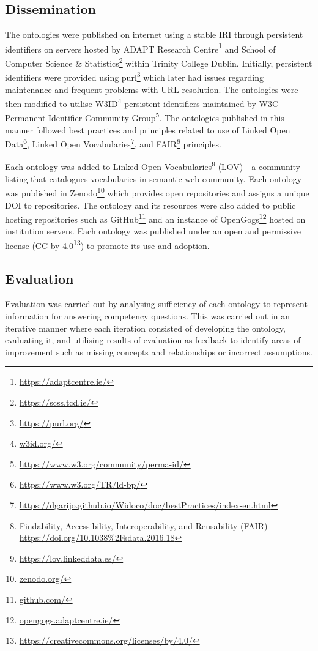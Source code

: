 \subsection{Dissemination}
The ontologies were published on internet using a stable IRI through persistent identifiers on servers hosted by ADAPT Research Centre\footnote{\url{https://adaptcentre.ie/}} and School of Computer Science \& Statistics\footnote{\url{https://scss.tcd.ie/}} within Trinity College Dublin. Initially, persistent identifiers were provided using purl\footnote{\url{https://purl.org/}} which later had issues regarding maintenance and frequent problems with URL resolution. The ontologies were then modified to utilise W3ID\footnote{\url{w3id.org/}} persistent identifiers maintained by W3C Permanent Identifier Community Group\footnote{\url{https://www.w3.org/community/perma-id/}}. The ontologies published in this manner followed best practices and principles related to use of Linked Open Data\footnote{\url{https://www.w3.org/TR/ld-bp/}}, Linked Open Vocabularies\footnote{\url{https://dgarijo.github.io/Widoco/doc/bestPractices/index-en.html}}, and FAIR\footnote{Findability, Accessibility, Interoperability, and Reusability (FAIR) \url{https://doi.org/10.1038\%2Fsdata.2016.18}} principles.

Each ontology was added to Linked Open Vocabularies\footnote{\url{https://lov.linkeddata.es/}} (LOV) - a community listing that catalogues vocabularies in semantic web community. Each ontology was published in Zenodo\footnote{\url{zenodo.org/}} which provides open repositories and assigns a unique DOI to repositories. The ontology and its resources were also added to public hosting repositories such as GitHub\footnote{\url{github.com/}} and an instance of OpenGogs\footnote{\url{opengogs.adaptcentre.ie/}} hosted on institution servers. Each ontology was published under an open and permissive license (CC-by-4.0\footnote{\url{https://creativecommons.org/licenses/by/4.0/}}) to promote its use and adoption.

\subsection{Evaluation}
Evaluation was carried out by analysing sufficiency of each ontology to represent information for answering competency questions. This was carried out in an iterative manner where each iteration consisted of developing the ontology, evaluating it, and utilising results of evaluation as feedback to identify areas of improvement such as missing concepts and relationships or incorrect assumptions.

